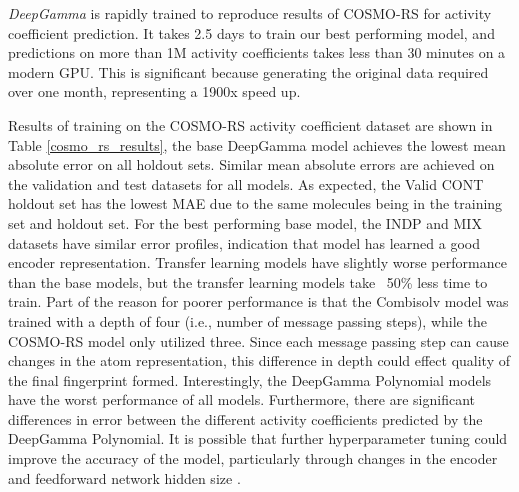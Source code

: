 \textit{DeepGamma} is rapidly trained to reproduce results of COSMO-RS for activity coefficient prediction. It takes 2.5 days to train our best performing model, and predictions on more than 1M activity coefficients takes less than 30 minutes on a modern GPU. This is significant because generating the original data required over one month, representing a 1900x speed up.


Results of training on the COSMO-RS activity coefficient dataset are shown in Table \ref{cosmo_rs_results}, the base DeepGamma model achieves the lowest mean absolute error on all holdout sets. Similar mean absolute errors are achieved on the validation and test datasets for all models. As expected, the Valid CONT holdout set has the lowest MAE due to the same molecules being in the training set and holdout set.  For the best performing base model, the INDP and MIX datasets have similar error profiles, indication that model has learned a good encoder representation.  Transfer learning models have slightly worse performance than the base models, but the transfer learning models take ~50\% less time to train. Part of the reason for poorer performance is that the Combisolv model was trained with a depth of four (i.e., number of message passing steps), while the COSMO-RS model only utilized three. Since each message passing step can cause changes in the atom representation, this difference in depth could effect quality of the final fingerprint formed. Interestingly, the DeepGamma Polynomial models have the worst performance of all models. Furthermore, there are significant differences in error between the different activity coefficients predicted by the DeepGamma Polynomial.  It is possible that further hyperparameter tuning could improve the accuracy of the model, particularly through changes in the encoder and feedforward network hidden size \cite{Yang2019, Vermeire2021}.

